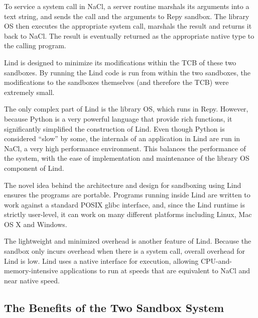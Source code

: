 To service a system call in NaCl, a server routine marshals its arguments into a text string, 
and sends the call and the arguments to Repy sandbox. 
The library OS then executes the appropriate system call, marshals the result and 
returns it back to NaCl. The result is eventually returned as the appropriate native type to the calling program. 

Lind is designed to minimize its modifications within the TCB of these two sandboxes. 
By running the Lind code is run from within the two sandboxes, 
the modifications to the sandboxes themselves (and therefore the TCB) were extremely small. 

The only complex part of Lind is the library OS, which runs in Repy. 
However, because Python is a very powerful language that provide rich functions, 
it significantly simplified the construction of Lind. Even though Python is considered ``slow'' by some, 
the internals of an application in Lind are run in NaCl, a very high performance environment. 
This balances the performance of the system, with the ease of implementation and maintenance 
of the library OS component of Lind. 

The novel idea behind the architecture and design for sandboxing using Lind ensures the programs are portable. 
Programs running inside Lind are written to work against a standard POSIX glibc interface, 
and, since the Lind runtime is strictly user-level, it can work on many different platforms 
including Linux, Mac OS X and Windows.

The lightweight and minimized overhead is another feature of Lind. Because the sandbox only incurs overhead when there is a system call, 
overall overhead for Lind is low. Lind uses a native interface for execution, 
allowing CPU-and-memory-intensive applications to run at speeds that are equivalent to NaCl and near native speed. 

\subsection{The Benefits of the Two Sandbox System}

